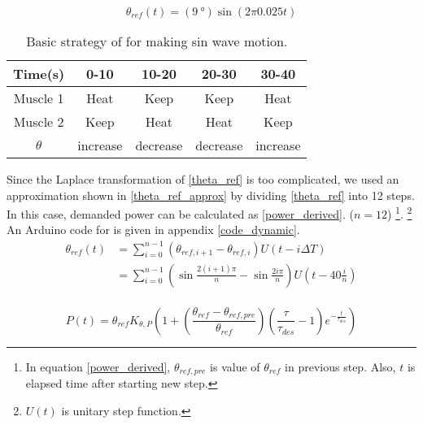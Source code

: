 


\begin{equation}\label{theta_ref}
\theta_{ref}(t)=(\SI{9}{\degree})\sin(2\pi 0.025t)
\end{equation}

\begin{table}[b]
	\caption{Basic strategy of \apc for making sin wave motion.}
	\label{table_apc_basic}
	\begin{center}
		\begin{tabular}{c||c|c|c|c}
			\hline
			Time(s) & 0-10 & 10-20 & 20-30 & 30-40 \\
			\hline
			Muscle 1 & Heat & Keep & Keep & Heat \\
			Muscle 2 & Keep & Heat & Heat & Keep \\
			\hline
			$\theta$ & increase & decrease & decrease & increase \\
			\hline
		\end{tabular}
	\end{center}
\end{table}

Since the Laplace transformation of \eqref{theta_ref} is too complicated, we used an approximation shown in \eqref{theta_ref_approx} by dividing \eqref{theta_ref} into 12 steps. In this case, demanded power can be calculated as \eqref{power_derived}. ($n=12$)
\footnote{In equation \eqref{power_derived}, $\theta_{ref,pre}$ is value of $\theta_{ref}$ in previous step. Also, $t$ is elapsed time after starting new step.}. 
\footnote{$U(t)$ is unitary step function.}
An Arduino code for \apc is given in appendix \ref{code_dynamic}.
\begin{equation} \label{theta_ref_approx}
\begin{aligned} 
\theta_{ref}(t) & = \sum_{i=0}^{n-1}{(\theta_{ref,i+1}-\theta_{ref,i})U(t-i\Delta T)} \\
& = \sum_{i=0}^{n-1}{(\sin{\frac{2(i+1)\pi}{n}}-\sin{\frac{2i\pi}{n}})U(t-40\frac{i}{n})} \\
\end{aligned}
\end{equation}

\begin{equation} \label{power_derived}
P(t)=\theta_{ref}K_{\theta,P}(1+(\frac{\theta_{ref}-\theta_{ref,pre}}{\theta_{ref}})(\frac{\tau}{\tau_{des}}-1)e^{-\frac{t}{\tau_{des}}})
\end{equation}


